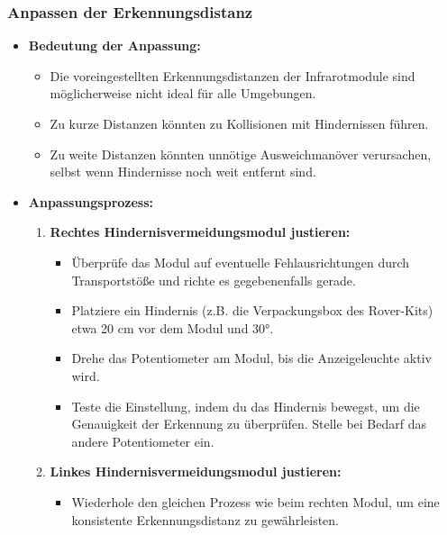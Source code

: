 \documentclass{vorlage-design-main}
\begin{document}
\hypertarget{anpassen-der-erkennungsdistanz}{%
\subsubsection{Anpassen der
Erkennungsdistanz}\label{anpassen-der-erkennungsdistanz}}

\begin{itemize}

\item
  \textbf{Bedeutung der Anpassung:}

  \begin{itemize}
  
  \item
    Die voreingestellten Erkennungsdistanzen der Infrarotmodule sind
    möglicherweise nicht ideal für alle Umgebungen.
  \item
    Zu kurze Distanzen könnten zu Kollisionen mit Hindernissen führen.
  \item
    Zu weite Distanzen könnten unnötige Ausweichmanöver verursachen,
    selbst wenn Hindernisse noch weit entfernt sind.
  \end{itemize}
\item
  \textbf{Anpassungsprozess:}

  \begin{enumerate}
  \def\labelenumi{\arabic{enumi}.}
  
  \item
    \textbf{Rechtes Hindernisvermeidungsmodul justieren:}

    \begin{itemize}
    
    \item
      Überprüfe das Modul auf eventuelle Fehlausrichtungen durch
      Transportstöße und richte es gegebenenfalls gerade.
    \item
      Platziere ein Hindernis (z.B. die Verpackungsbox des Rover-Kits)
      etwa 20 cm vor dem Modul und 30°.
    \item
      Drehe das Potentiometer am Modul, bis die Anzeigeleuchte aktiv
      wird.
    \item
      Teste die Einstellung, indem du das Hindernis bewegst, um die
      Genauigkeit der Erkennung zu überprüfen. Stelle bei Bedarf das
      andere Potentiometer ein.
    \end{itemize}
  \item
    \textbf{Linkes Hindernisvermeidungsmodul justieren:}

    \begin{itemize}
    
    \item
      Wiederhole den gleichen Prozess wie beim rechten Modul, um eine
      konsistente Erkennungsdistanz zu gewährleisten.
    \end{itemize}
  \end{enumerate}
\end{itemize}
\end{document}
